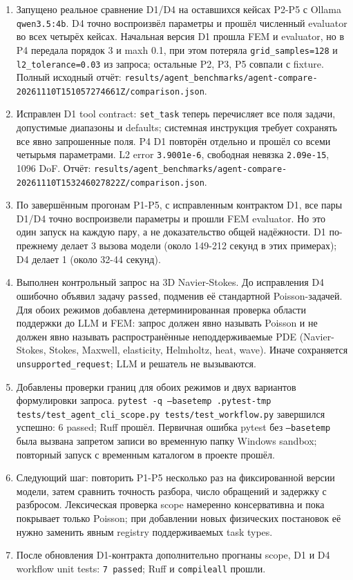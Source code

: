 \documentclass[11pt,a4paper]{article}
\begin{document}
\begin{enumerate}
    \item Запущено реальное сравнение D1/D4 на оставшихся кейсах P2-P5 с Ollama \texttt{qwen3.5:4b}. D4 точно воспроизвёл параметры и прошёл численный evaluator во всех четырёх кейсах. Начальная версия D1 прошла FEM и evaluator, но в P4 передала порядок 3 и maxh 0.1, при этом потеряла \texttt{grid\_samples=128} и \texttt{l2\_tolerance=0.03} из запроса; остальные P2, P3, P5 совпали с fixture. Полный исходный отчёт: \texttt{results/agent\_benchmarks/agent-compare-20261110T151057274661Z/comparison.json}.
    \item Исправлен D1 tool contract: \texttt{set\_task} теперь перечисляет все поля задачи, допустимые диапазоны и defaults; системная инструкция требует сохранять все явно запрошенные поля. P4 D1 повторён отдельно и прошёл со всеми четырьмя параметрами. L2 error \texttt{3.9001e-6}, свободная невязка \texttt{2.09e-15}, 1096 DoF. Отчёт: \texttt{results/agent\_benchmarks/agent-compare-20261110T153246027822Z/comparison.json}.
    \item По завершённым прогонам P1-P5, с исправленным контрактом D1, все пары D1/D4 точно воспроизвели параметры и прошли FEM evaluator. Но это один запуск на каждую пару, а не доказательство общей надёжности. D1 по-прежнему делает 3 вызова модели (около 149-212 секунд в этих примерах); D4 делает 1 (около 32-44 секунд).
    \item Выполнен контрольный запрос на 3D Navier-Stokes. До исправления D4 ошибочно объявил задачу \texttt{passed}, подменив её стандартной Poisson-задачей. Для обоих режимов добавлена детерминированная проверка области поддержки до LLM и FEM: запрос должен явно называть Poisson и не должен явно называть распространённые неподдерживаемые PDE (Navier-Stokes, Stokes, Maxwell, elasticity, Helmholtz, heat, wave). Иначе сохраняется \texttt{unsupported\_request}; LLM и решатель не вызываются.
    \item Добавлены проверки границ для обоих режимов и двух вариантов формулировки запроса. \texttt{pytest -q --basetemp .pytest-tmp tests/test\_agent\_cli\_scope.py tests/test\_workflow.py} завершился успешно: 6 passed; Ruff прошёл. Первичная ошибка pytest без \texttt{--basetemp} была вызвана запретом записи во временную папку Windows sandbox; повторный запуск с временным каталогом в проекте прошёл.
    \item Следующий шаг: повторить P1-P5 несколько раз на фиксированной версии модели, затем сравнить точность разбора, число обращений и задержку с разбросом. Лексическая проверка scope намеренно консервативна и пока покрывает только Poisson; при добавлении новых физических постановок её нужно заменить явным registry поддерживаемых task types.
    \item После обновления D1-контракта дополнительно прогнаны scope, D1 и D4 workflow unit tests: \texttt{7 passed}; Ruff и \texttt{compileall} прошли.
\end{enumerate}
\end{document}
